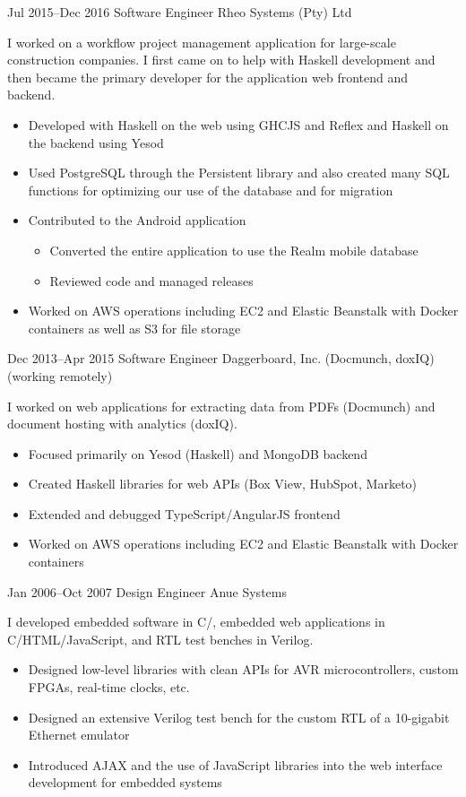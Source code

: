 \documentclass[11pt,a4paper,roman]{moderncv}
\begin{document}
\cventry%
{Jul 2015--Dec 2016}%
{Software Engineer}%
{Rheo Systems (Pty) Ltd}%
{\pretoria}%
{}%
{I worked on a workflow project management application for large-scale construction companies. I first came on to help with Haskell development and then became the primary developer for the application web frontend and backend.
\begin{itemize}
\item Developed with Haskell on the web using GHCJS and Reflex and Haskell on the backend using Yesod
\item Used PostgreSQL through the Persistent library and also created many SQL functions for optimizing our use of the database and for migration
\item Contributed to the Android application
  \begin{itemize}
  \item Converted the entire application to use the Realm mobile database
  \item Reviewed code and managed releases
  \end{itemize}
\item Worked on AWS operations including EC2 and Elastic Beanstalk with Docker containers as well as S3 for file storage
\end{itemize}}

\cventry%
{Dec 2013--Apr 2015}%
{Software Engineer}%
{Daggerboard, Inc. (Docmunch, doxIQ)}%
{\sanfrancisco{} (working remotely)}%
{}%
{I worked on web applications for extracting data from PDFs (Docmunch) and document hosting with analytics (doxIQ).
\begin{itemize}
\item Focused primarily on Yesod (Haskell) and MongoDB backend
\item Created Haskell libraries for web APIs (Box View, HubSpot, Marketo)
\item Extended and debugged TypeScript/AngularJS frontend
\item Worked on AWS operations including EC2 and Elastic Beanstalk with Docker containers
\end{itemize}}

\cventry%
{Jan 2006--Oct 2007}%
{Design Engineer}%
{Anue Systems}%
{\austin}%
{}%
{I developed embedded software in C/\Cpp, embedded web applications in C/HTML/JavaScript, and RTL test benches in Verilog.
\begin{itemize}
\item Designed low-level libraries with clean APIs for AVR microcontrollers, custom FPGAs, real-time clocks, etc.
\item Designed an extensive Verilog test bench for the custom RTL of a 10-gigabit Ethernet emulator
\item Introduced AJAX and the use of JavaScript libraries into the web interface development for embedded systems
\end{itemize}}
\end{document}
